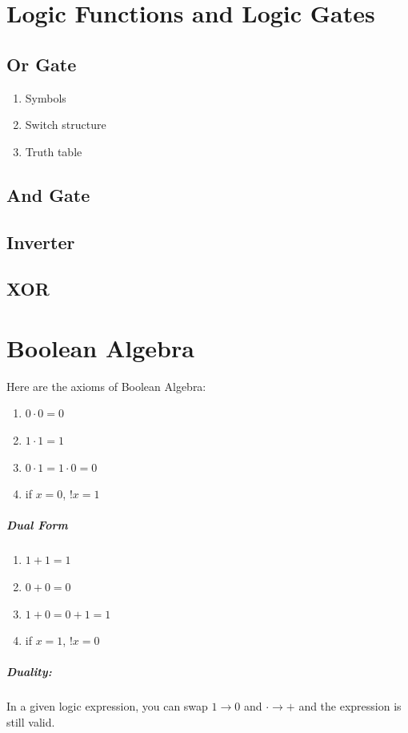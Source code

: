 \documentclass[a4paper,12pt]{report}
\begin{document}
\chapter{Logic Functions and Logic Gates}
\section{Or Gate}
\begin{enumerate}
\item Symbols
\item Switch structure
\item Truth table
\end{enumerate}

\section{And Gate}

\section{Inverter}

\section{XOR}


\chapter{Boolean Algebra}
Here are the axioms of Boolean Algebra:
\begin{enumerate}
\item $0 \cdot 0 = 0$
\item $1 \cdot 1 = 1$
\item $0 \cdot 1 = 1 \cdot 0 = 0$
\item if $x = 0$, $!x = 1$
\end{enumerate}

\paragraph{Dual Form}
\begin{enumerate}
\item $1 + 1 = 1$
\item $0 + 0 = 0$
\item $1 + 0 = 0 + 1 = 1$
\item if $x = 1$, $!x = 0$
\end{enumerate}

\paragraph{Duality: } In a given logic expression, you can swap $1 \to 0$ and $\cdot \to +$
and the expression is still valid.
\end{document}
